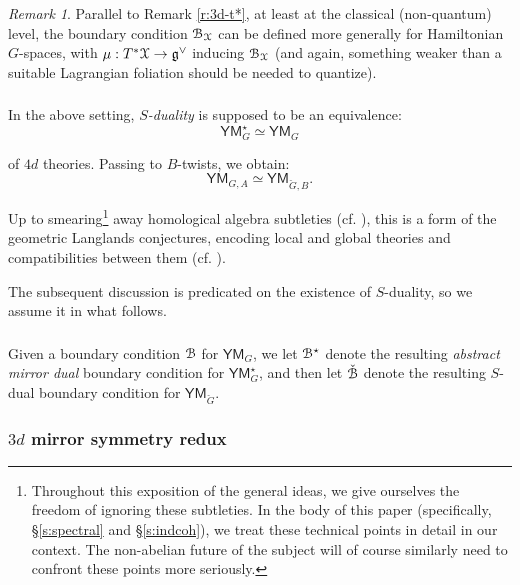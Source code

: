 \documentclass[reqno,11pt]{amsart}
\numberwithin{equation}{subsection}
\theoremstyle{remark}
\newtheorem{rem}[thm]{Remark}
\newcommand{\sB}{{\EuScript B}}
\newcommand{\sX}{{\EuScript X}}
\newcommand{\fg}{{\mathfrak g}}
\newcommand{\YM}{\mathsf{YM}}
\begin{document}
\begin{rem}

Parallel to Remark \ref{r:3d-t*}, at least at the classical (non-quantum) level,
the boundary condition $\sB_{\sX}$ can be defined more generally for
Hamiltonian $G$-spaces, with $\mu:T^*\sX \to \fg^{\vee}$ inducing
$\sB_{\sX}$ (and again, something weaker than 
a suitable Lagrangian foliation should be needed to quantize).

\end{rem}

\subsubsection{}

In the above setting, \emph{$S$-duality} is supposed to be an equivalence:
%
\[
\YM_G^{\star} \simeq \YM_G
\]

\noindent of $4d$ theories. Passing to $B$-twists, we obtain:
%
\[
\YM_{G,A} \simeq \YM_{\check{G},B}.
\]

\noindent Up to smearing\footnote{Throughout this exposition of the general ideas, 
we give ourselves the freedom of ignoring these subtleties. 
In the body of this paper (specifically, \S \ref{s:spectral} and \S \ref{s:indcoh}), 
we treat these technical points in detail in our context. The non-abelian future of the
subject will of course similarly need to confront these points more seriously.} 
away homological algebra subtleties 
(cf. \cite{arinkin-gaitsgory}), this is a form of the geometric Langlands
conjectures, encoding local and global theories and compatibilities
between them (cf. \cite{quantum-langlands-summary}). 

The subsequent discussion is predicated on the existence of $S$-duality, so 
we assume it in what follows. 

\subsubsection{}

Given a boundary condition $\sB$ for $\YM_G$, we let 
$\sB^{\star}$ denote the resulting \emph{abstract mirror dual}
boundary condition for $\YM_G^{\star}$, and then let
$\check{\sB}$ denote the resulting $S$-dual boundary condition for 
$\YM_{\check{G}}$.

\subsubsection{$3d$ mirror symmetry redux}
\end{document}
